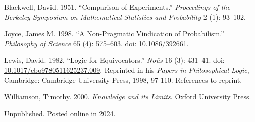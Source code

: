 \documentclass[
  10pt,
  letterpaper,
  DIV=11,
  numbers=noendperiod,
  twoside]{scrartcl}
\newlength{\cslhangindent}
\newenvironment{CSLReferences}[2] %
 {\begin{list}{}{%
  \setlength{\itemindent}{0pt}
  \setlength{\leftmargin}{0pt}
  \setlength{\parsep}{0pt}
  \ifodd #1
   \setlength{\leftmargin}{\cslhangindent}
   \setlength{\itemindent}{-1\cslhangindent}
  \fi
  \setlength{\itemsep}{#2\baselineskip}}}
 {\end{list}}
\begin{document}
\label{refs}
\begin{CSLReferences}{1}{0}
Blackwell, David. 1951. {``Comparison of Experiments.''}
\emph{Proceedings of the Berkeley Symposium on Mathematical Statistics
and Probability} 2 (1): 93--102.

Joyce, James M. 1998. {``A Non-Pragmatic Vindication of Probabilism.''}
\emph{Philosophy of Science} 65 (4): 575--603. doi:
\href{https://doi.org/10.1086/392661}{10.1086/392661}.

Lewis, David. 1982. {``Logic for Equivocators.''} \emph{No{û}s} 16 (3):
431--41. doi:
\href{https://doi.org/10.1017/cbo9780511625237.009}{10.1017/cbo9780511625237.009}.
Reprinted in his \emph{Papers in Philosophical Logic}, Cambridge:
Cambridge University Press, 1998, 97-110. References to reprint.

Williamson, Timothy. 2000. \emph{{Knowledge and its Limits}}. Oxford
University Press.

\end{CSLReferences}



\noindent Unpublished. Posted online in 2024.
\end{document}

